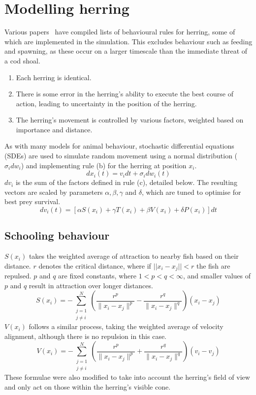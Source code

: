 \documentclass[12pt]{article}
\begin{document}
\section{Modelling herring}
Various papers\supercite{Giske2008_EmergingSchoolStructures}\,\supercite{HartonoNguyenTa2024}\,\supercite{Isaeva2012_SelfOrganizationBiologicalSystems}\,\supercite{TaNguyenYagi2017_foraging} have compiled lists of behavioural rules for herring, some of which are implemented in the simulation. This excludes behaviour such as feeding and spawning, as these occur on a larger timescale than the immediate threat of a cod shoal.
\begin{enumerate}[label=(\alph*)]
\item Each herring is identical.
\item There is some error in the herring's ability to execute the best course of action, leading to uncertainty in the position of the herring.
\item The herring's movement is controlled by various factors, weighted based on importance and distance.
\end{enumerate}
As with many models for animal behaviour, stochastic differential equations\supercite{TaNguyenYagi2017_foraging} (SDEs) are used to simulate random movement using a normal distribution ($\sigma_idw_i$) and implementing rule (b) for the herring at position $x_i$.
\begin{equation}
    dx_i(t) = v_idt +\sigma_i dw_i(t)
\end{equation}
$dv_i$ is the sum of the factors defined in rule (c), detailed below. The resulting vectors are scaled by parameters $\alpha,\beta,\gamma$ and $\delta$, which are tuned to optimise for best prey survival.
\begin{equation}
        dv_i(t) =[\alpha S(x_i)+\gamma T(x_i) +\beta V(x_i)+\delta P(x_i)]dt
\end{equation}
\subsection{Schooling behaviour}
$S(x_i)$\supercite{UchitaneTonYagi2012_ODEFishSchooling} takes the weighted average of attraction to nearby fish based on their distance. $r$ denotes the critical distance, where if $||x_i-x_j||<r$ the fish are repulsed. $p$ and $q$ are fixed constants, where $1 < p < q < \infty$, and smaller values of $p$ and $q$ result in attraction over longer distances.
\begin{equation}
    S(x_i)=- \sum_{\substack{j=1 \\ j \neq i}}^N \left( \frac{r^p}{\|x_i - x_j\|^p} - \frac{r^q}{\|x_i - x_j\|^q} \right)(x_i - x_j)
\end{equation}
$V(x_i)$\supercite{UchitaneTonYagi2012_ODEFishSchooling} follows a similar process, taking the weighted average of velocity alignment, although there is no repulsion in this case.
\begin{equation}
    V(x_i)= - \sum_{\substack{j=1 \\ j \neq i}}^N \left( \frac{r^p}{\|x_i - x_j\|^p} + \frac{r^q}{\|x_i - x_j\|^q}\right)(v_i - v_j) 
\end{equation}
These formulae were also modified to take into account the herring's field of view and only act on those within the herring's visible cone.
\end{document}
